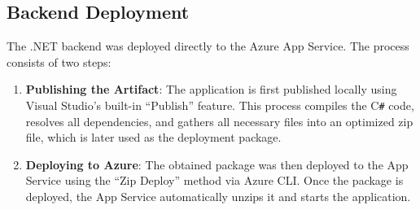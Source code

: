 \subsection{Backend Deployment}

The .NET backend was deployed directly to the Azure App Service. The process consists of two steps:

\begin{enumerate} [leftmargin=0.75cm]
    \item \textbf{Publishing the Artifact}: The application is first published locally using Visual Studio's built-in “Publish” feature. This process compiles the C\texttt{\#} code, resolves all dependencies, and gathers all necessary files into an optimized zip file, which is later used as the deployment package. 

    \item \textbf{Deploying to Azure}: The obtained package was then deployed to the App Service using the “Zip Deploy” method via Azure CLI. Once the package is deployed, the App Service automatically unzips it and starts the application.

\end{enumerate}